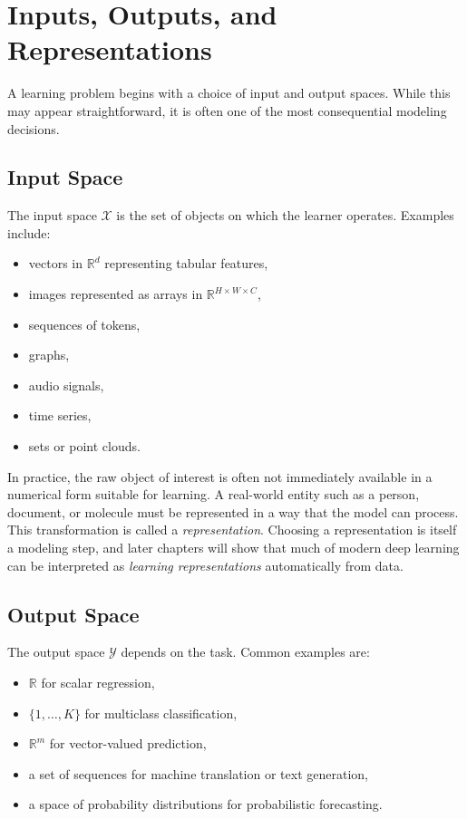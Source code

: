 \section{Inputs, Outputs, and Representations}

A learning problem begins with a choice of input and output spaces. While this may appear straightforward, it is often one of the most consequential modeling decisions.

\subsection{Input Space}

The input space $\mathcal{X}$ is the set of objects on which the learner operates. Examples include:
\begin{itemize}
    \item vectors in $\mathbb{R}^d$ representing tabular features,
    \item images represented as arrays in $\mathbb{R}^{H \times W \times C}$,
    \item sequences of tokens,
    \item graphs,
    \item audio signals,
    \item time series,
    \item sets or point clouds.
\end{itemize}

In practice, the raw object of interest is often not immediately available in a numerical form suitable for learning. A real-world entity such as a person, document, or molecule must be represented in a way that the model can process. This transformation is called a \emph{representation}. Choosing a representation is itself a modeling step, and later chapters will show that much of modern deep learning can be interpreted as \emph{learning representations} automatically from data.

\subsection{Output Space}

The output space $\mathcal{Y}$ depends on the task. Common examples are:
\begin{itemize}
    \item $\mathbb{R}$ for scalar regression,
    \item $\{1,\dots,K\}$ for multiclass classification,
    \item $\mathbb{R}^m$ for vector-valued prediction,
    \item a set of sequences for machine translation or text generation,
    \item a space of probability distributions for probabilistic forecasting.
\end{itemize}


